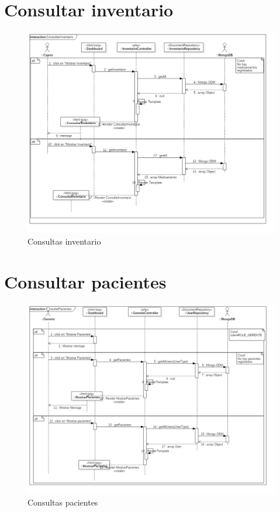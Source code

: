 \section{Consultar inventario}
	\begin{figure}[htbp!]
		\centering
			\includegraphics[width=1\textwidth]{uml/DiagramasSecuencia/DemisGomez/consultarInventario}
		\caption{Consultas inventario}
	\end{figure}
	\newpage
\section{Consultar pacientes}
	\begin{figure}[htbp!]
		\centering
			\includegraphics[width=1\textwidth]{uml/DiagramasSecuencia/DemisGomez/consultarPacientes}
		\caption{Consultas pacientes}
	\end{figure}
	\newpage
